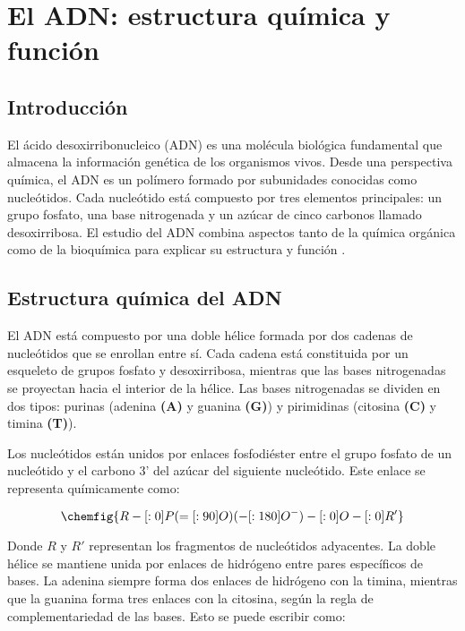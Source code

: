 \chapter{El ADN: estructura química y función}

\section{Introducción}

El ácido desoxirribonucleico (ADN) es una molécula biológica fundamental que almacena la información genética de los organismos vivos. Desde una perspectiva química, el ADN es un polímero formado por subunidades conocidas como nucleótidos. Cada nucleótido está compuesto por tres elementos principales: un grupo fosfato, una base nitrogenada y un azúcar de cinco carbonos llamado desoxirribosa. El estudio del ADN combina aspectos tanto de la química orgánica como de la bioquímica para explicar su estructura y función \parencite{@5290-BRUCE2002,@5291-TOM1999}.

\section{Estructura química del ADN}

El ADN está compuesto por una doble hélice formada por dos cadenas de nucleótidos que se enrollan entre sí. Cada cadena está constituida por un esqueleto de grupos fosfato y desoxirribosa, mientras que las bases nitrogenadas se proyectan hacia el interior de la hélice. Las bases nitrogenadas se dividen en dos tipos: purinas (adenina \textbf{(A)} y guanina \textbf{(G)}) y pirimidinas (citosina \textbf{(C)} y timina \textbf{(T)}).

Los nucleótidos están unidos por enlaces fosfodiéster entre el grupo fosfato de un nucleótido y el carbono 3' del azúcar del siguiente nucleótido. Este enlace se representa químicamente como:

\begin{equation*}
\chemfig{R-[:0]P(=[:90]O)(-[:180]O^-)-[:0]O-[:0]R'}
\end{equation*}

Donde $R$ y $R'$ representan los fragmentos de nucleótidos adyacentes. La doble hélice se mantiene unida por enlaces de hidrógeno entre pares específicos de bases. La adenina siempre forma dos enlaces de hidrógeno con la timina, mientras que la guanina forma tres enlaces con la citosina, según la regla de complementariedad de las bases. Esto se puede escribir como:

